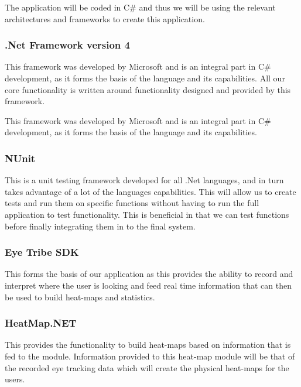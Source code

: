 The application will be coded in C\# and thus we will be using the relevant architectures and frameworks to create this application.

\subsubsection{.Net Framework version 4}
\begin{flushleft}
	This framework was developed by Microsoft and is an integral part in C\# development, as it forms the basis of the language and its capabilities. All our core functionality is written around functionality designed and provided by this framework.
	
	This framework was developed by Microsoft and is an integral part in C\# development, as it forms the basis of the language and its capabilities.
\end{flushleft}

\subsubsection{NUnit}
\begin{flushleft}
This is a unit testing framework developed for all .Net languages, and in turn takes advantage of a lot of the languages capabilities. This will allow us to create tests and run them on specific functions without having to run the full application to test functionality. This is beneficial in that we can test functions before finally integrating them in to the final system.
\end{flushleft}

\subsubsection{Eye Tribe SDK}
\begin{flushleft}
This forms the basis of our application as this provides the ability to record and interpret where the user is looking and feed real time information that can then be used to build heat-maps and statistics.
\end{flushleft}

\subsubsection{HeatMap.NET}
\begin{flushleft}
This provides the functionality to build heat-maps based on information that is fed to the module. Information provided to this heat-map module will be that of the recorded eye tracking data which will create the physical heat-maps for the users.
\end{flushleft}

